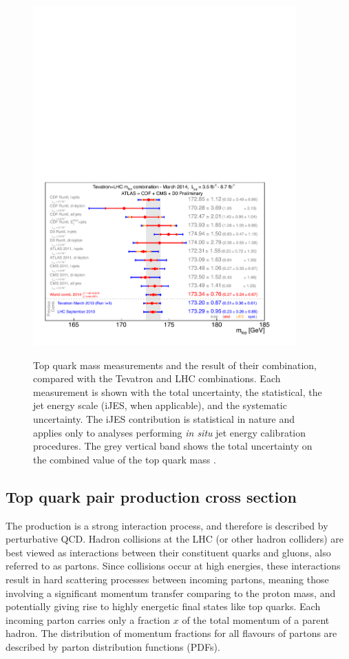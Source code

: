 \begin{figure}[hbtp]
   \centering
   {\includegraphics[width=0.9\textwidth]{top_world_combination}}
   \caption[World combination of the top quark mass measurements]{Top quark mass measurements and the result of their
   combination, compared with the Tevatron and LHC combinations. Each measurement is shown with the total uncertainty,
   the statistical, the jet energy scale (iJES, when applicable), and the systematic uncertainty. The iJES contribution
   is statistical in nature and applies only to analyses performing \textit{in situ} jet energy calibration procedures.
   The grey vertical band shows the total uncertainty on the combined value of the top quark mass
   \autocite{world_top_mass_combination}.}
   \label{fig:top_mass_world_combination}
\end{figure}

\subsection{Top quark pair production cross section}
\label{ss:ttbar_cross_section}
The \ttbar production is a strong interaction process, and therefore is described by perturbative QCD. Hadron collisions
at the LHC (or other hadron colliders) are best viewed as interactions between their constituent quarks and gluons, also
referred to as partons. Since collisions occur at high energies, these interactions result in hard scattering processes
between incoming partons, meaning those involving a significant momentum transfer comparing to the proton mass, and
potentially giving rise to highly energetic final states like top quarks. Each incoming parton carries only a fraction
$x$ of the total momentum of a parent hadron. The distribution of momentum fractions for all flavours of partons are
described by parton distribution functions (PDFs).

